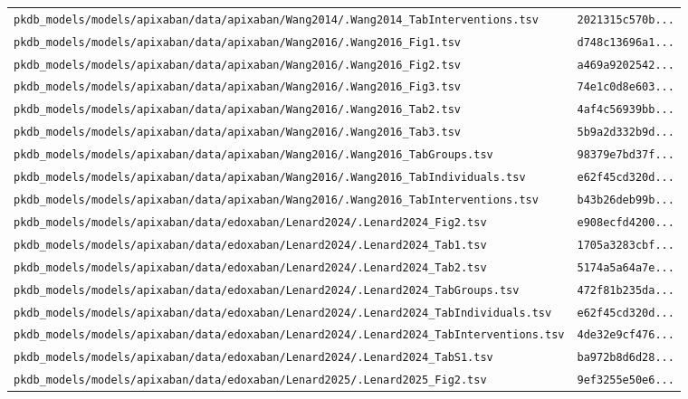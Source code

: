 \begin{longtable}{ll}
\texttt{pkdb\_models/models/apixaban/data/apixaban/Wang2014/.Wang2014\_TabInterventions.tsv} & \texttt{2021315c570b...} \\
\texttt{pkdb\_models/models/apixaban/data/apixaban/Wang2016/.Wang2016\_Fig1.tsv} & \texttt{d748c13696a1...} \\
\texttt{pkdb\_models/models/apixaban/data/apixaban/Wang2016/.Wang2016\_Fig2.tsv} & \texttt{a469a9202542...} \\
\texttt{pkdb\_models/models/apixaban/data/apixaban/Wang2016/.Wang2016\_Fig3.tsv} & \texttt{74e1c0d8e603...} \\
\texttt{pkdb\_models/models/apixaban/data/apixaban/Wang2016/.Wang2016\_Tab2.tsv} & \texttt{4af4c56939bb...} \\
\texttt{pkdb\_models/models/apixaban/data/apixaban/Wang2016/.Wang2016\_Tab3.tsv} & \texttt{5b9a2d332b9d...} \\
\texttt{pkdb\_models/models/apixaban/data/apixaban/Wang2016/.Wang2016\_TabGroups.tsv} & \texttt{98379e7bd37f...} \\
\texttt{pkdb\_models/models/apixaban/data/apixaban/Wang2016/.Wang2016\_TabIndividuals.tsv} & \texttt{e62f45cd320d...} \\
\texttt{pkdb\_models/models/apixaban/data/apixaban/Wang2016/.Wang2016\_TabInterventions.tsv} & \texttt{b43b26deb99b...} \\
\texttt{pkdb\_models/models/apixaban/data/edoxaban/Lenard2024/.Lenard2024\_Fig2.tsv} & \texttt{e908ecfd4200...} \\
\texttt{pkdb\_models/models/apixaban/data/edoxaban/Lenard2024/.Lenard2024\_Tab1.tsv} & \texttt{1705a3283cbf...} \\
\texttt{pkdb\_models/models/apixaban/data/edoxaban/Lenard2024/.Lenard2024\_Tab2.tsv} & \texttt{5174a5a64a7e...} \\
\texttt{pkdb\_models/models/apixaban/data/edoxaban/Lenard2024/.Lenard2024\_TabGroups.tsv} & \texttt{472f81b235da...} \\
\texttt{pkdb\_models/models/apixaban/data/edoxaban/Lenard2024/.Lenard2024\_TabIndividuals.tsv} & \texttt{e62f45cd320d...} \\
\texttt{pkdb\_models/models/apixaban/data/edoxaban/Lenard2024/.Lenard2024\_TabInterventions.tsv} & \texttt{4de32e9cf476...} \\
\texttt{pkdb\_models/models/apixaban/data/edoxaban/Lenard2024/.Lenard2024\_TabS1.tsv} & \texttt{ba972b8d6d28...} \\
\texttt{pkdb\_models/models/apixaban/data/edoxaban/Lenard2025/.Lenard2025\_Fig2.tsv} & \texttt{9ef3255e50e6...} \\

\end{longtable}
